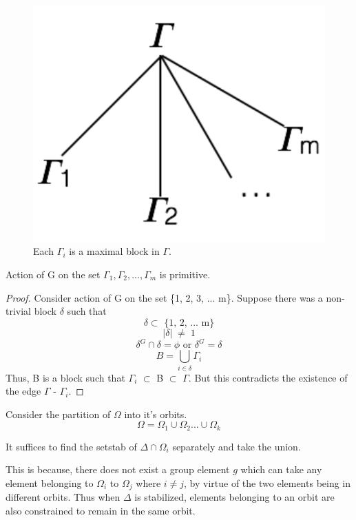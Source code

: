 \begin{figure}[htp!]
	\centering
	\includegraphics[scale=0.5]{images/structuretree.pdf}
	\caption{Each $\Gamma_{i}$ is a maximal block in $\Gamma$.}
	\label{fig:maxblocks}
\end{figure}

\begin{claim}
Action of G on the set ${\Gamma_{1}, \Gamma_{2}, ..., \Gamma_{m}}$ is primitive.
\end{claim}
\begin{proof}
Consider action of G on the set \{1, 2, 3, ... m\}. Suppose there was a non-trivial block $\delta$ such that
\[ \delta \subset \text{ \{1, 2, ... m\}} \]
\[ |\delta| \; \neq \; 1 \]
\[ \delta^{G} \cap \delta = \phi \text{ or } \delta^{G} = \delta \]
\[ B = \bigcup_{i \in \delta} \Gamma_{i} \]
Thus, B is a block such that $\Gamma_{i}$ $\subset$ B $\subset$ $\Gamma$. But this contradicts the existence of the edge $\Gamma$ - $\Gamma_{i}$.
\end{proof}

Consider the partition of $\Omega$ into it's orbits.
$$ \Omega = \Omega_{1} \cup \Omega_{2} ... \cup \Omega_{k} $$

\begin{observation}
It suffices to find the setstab of $\Delta\cap\Omega_{i}$ separately and take the union.
\end{observation}

This is because, there does not exist a group element $g$ which can take any element belonging to $\Omega_{i}$ to $\Omega_{j}$ where $i \neq j$, by virtue of the two elements being in different orbits. Thus when $\Delta$ is stabilized, elements belonging to an orbit are also constrained to remain in the same orbit.

